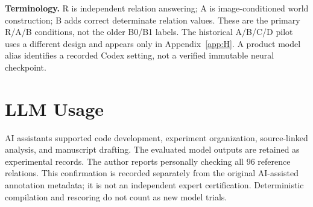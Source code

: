 \documentclass[11pt,letterpaper]{article}
\numberwithin{equation}{section}
\numberwithin{figure}{section}
\numberwithin{table}{section}
\begin{document}
\textbf{Terminology.} R is independent relation answering; A is image-conditioned world construction; B adds correct determinate relation values. These are the primary R/A/B conditions, not the older B0/B1 labels. The historical A/B/C/D pilot uses a different design and appears only in Appendix~\ref{app:H}. A product model alias identifies a recorded Codex setting, not a verified immutable neural checkpoint.

\appendix
\clearpage
\clearpage
\clearpage
\clearpage
\clearpage
\clearpage
\clearpage
\clearpage
\clearpage
\clearpage
\clearpage
\section*{LLM Usage}
AI assistants supported code development, experiment organization, source-linked analysis, and manuscript drafting. The evaluated model outputs are retained as experimental records. The author reports personally checking all 96 reference relations. This confirmation is recorded separately from the original AI-assisted annotation metadata; it is not an independent expert certification. Deterministic compilation and rescoring do not count as new model trials.


\end{document}
